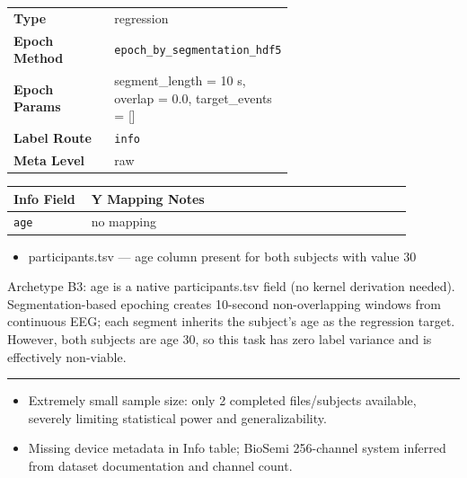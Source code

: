{\begin{tcolorbox}
{\begin{tabular}{@{}lp{0.62\linewidth}@{}}
\textbf{Type} & regression \\
\textbf{Epoch Method} & \texttt{epoch\_by\_segmentation\_hdf5} \\
\textbf{Epoch Params} & segment\_length = 10 s, overlap = 0.0, target\_events = [] \\
\textbf{Label Route} & \texttt{info} \\
\textbf{Meta Level} & raw \\
\end{tabular}}
\par{}\par\smallskip
\begingroup\footnotesize
\begin{tabular}{@{}p{0.1760\linewidth}p{0.7040\linewidth}@{}}
\toprule
\textbf{Info Field} & \textbf{Y Mapping Notes} \\
\midrule
\texttt{age} & no mapping \\
\bottomrule
\end{tabular}
\endgroup
\par{}\par
\begin{itemize}[leftmargin=1.3em,noitemsep,topsep=1pt]
\item[\scriptsize$\cdot$] {\scriptsize participants.tsv --- age column present for both subjects with value 30}
\end{itemize}
\par{} {\footnotesize Archetype B3: age is a native participants.tsv field (no kernel derivation needed). Segmentation-based epoching creates 10-second non-overlapping windows from continuous EEG; each segment inherits the subject's age as the regression target. However, both subjects are age 30, so this task has zero label variance and is effectively non-viable.}
\par\smallskip
\noindent\rule{\linewidth}{0.4pt}\par\nopagebreak
{}\par\smallskip
\begin{itemize}[leftmargin=1.4em,noitemsep,topsep=2pt]
\item{\footnotesize Extremely small sample size: only 2 completed files/subjects available, severely limiting statistical power and generalizability.}
\item{\footnotesize Missing device metadata in Info table; BioSemi 256-channel system inferred from dataset documentation and channel count.}

\end{itemize}
\end{tcolorbox}}
